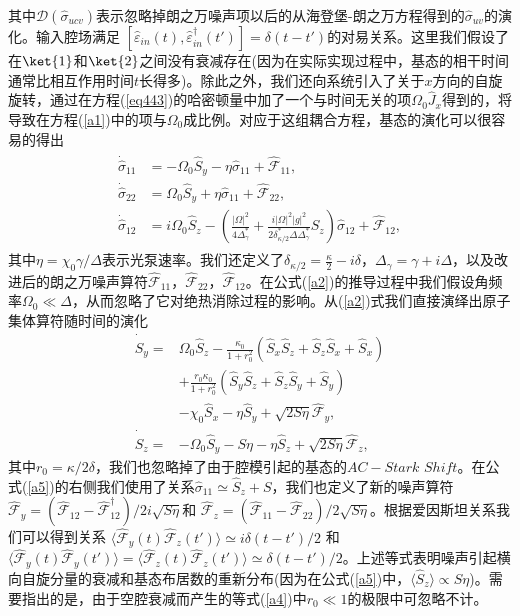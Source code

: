 其中$\mathcal {D}(\hat\sigma_{ucv})$表示忽略掉朗之万噪声项以后的从海登堡-朗之万方程得到的${\hat\sigma}_{uv}$的演化。输入腔场满足 $[\hat\varepsilon_{in}(t),\hat\varepsilon_{in}^\dag(t')]=\delta(t-t')$的对易关系。这里我们假设了在$\ket{1}$和$\ket{2}$之间没有衰减存在(因为在实际实现过程中，基态的相干时间通常比相互作用时间$t$长得多)。除此之外，我们还向系统引入了关于$x$方向的自旋旋转，通过在方程(\ref{eq443})的哈密顿量中加了一个与时间无关的项$\Omega_0 \hat J_x$得到的，将导致在方程(\ref{a1})中的项与$\Omega_0 $成比例。对应于这组耦合方程，基态的演化可以很容易的得出
\begin{align}\label{a2}
\begin{split}
\dot {\hat \sigma}_{11} &= -\Omega_0 {\hat S}_y - \eta{\hat\sigma}_{11} +\hat{\mathcal{F}}_{11}, \\
\dot {\hat \sigma}_{22} &= \Omega_0 {\hat S}_y +\eta{\hat\sigma}_{11}+\hat{\mathcal{F}}_{22},\\
\dot {\hat \sigma}_{12} &= i\Omega_0 {\hat S}_z - \left(\frac{|\Omega|^2}{4\Delta_\gamma^\ast}+  \frac{i|\Omega|^2|g|^2}{2\delta_{\kappa/2}^\ast\Delta\Delta_\gamma^\ast}S_z\right){\hat\sigma}_{12}+\hat{\mathcal{F}}_{12}, 
\end{split}
\end{align}
其中$\eta=\chi_0\gamma/\Delta$表示光泵速率。我们还定义了$\delta_{\kappa/2}=\frac\kappa2-i\delta$，$\Delta_\gamma=\gamma+i\Delta$，以及改进后的朗之万噪声算符$\hat{\mathcal{F}}_{11}$，$\hat{\mathcal{F}}_{22}$，$\hat{\mathcal{F}}_{12}$。在公式(\ref{a2})的推导过程中我们假设角频率$\Omega_0\ll \Delta$，从而忽略了它对绝热消除过程的影响。从(\ref{a2})式我们直接演绎出原子集体算符随时间的演化
\begin{align}
{{\dot {\hat S}}_y} =&   {\Omega _0}{{\hat S}_z} - \frac{\kappa_0}{1+r_0^2}\left( {{{\hat S}_x}{{\hat S}_z} + {{\hat S}_z}{{\hat S}_x} + {{\hat S}_x}} \right)\nonumber\\
&+ \frac{r_0\kappa_0}{1+r_0^2}\left( {{{\hat S}_y}{{\hat S}_z} + {{\hat S}_z}{{\hat S}_y} + {{\hat S}_y}} \right)\label{a4}\\
&- {\chi _0}{{\hat S}_x} - \eta {{\hat S}_y} + \sqrt {2S\eta } {\hat {\mathcal{F}}_y},\nonumber\\
\dot {\hat S}_z=&  -\Omega_0 {\hat S}_y - S\eta- \eta{\hat S}_z  +\sqrt{2S\eta}\hat{\mathcal{F}}_z,\label{a5}
\end{align}
其中$r_0=\kappa/2\delta$，我们也忽略掉了由于腔模引起的基态的$AC-Stark$ $Shift$。在公式(\ref{a5})的右侧我们使用了关系$\hat\sigma_{11}\simeq\hat S_z+S$，我们也定义了新的噪声算符$\hat{\mathcal{F}}_y= (\hat{\mathcal{F}}_{12}-\hat{\mathcal{F}}_{12}^\dag)/2i\sqrt{S\eta}$和 $\hat{\mathcal{F}}_z= (\hat{\mathcal{F}}_{11}-\hat{\mathcal{F}}_{22})/2\sqrt{S\eta}$。根据爱因斯坦关系我们可以得到关系 $\langle\hat{\mathcal{F}}_y(t) \hat{\mathcal{F}}_z(t')\rangle\simeq i\delta(t-t')/2$ 和 $\langle\hat{\mathcal{F}}_y(t)\hat{\mathcal{F}}_y(t')\rangle=\langle\hat{\mathcal{F}}_z(t)\hat{\mathcal{F}}_z(t')\rangle\simeq \delta(t-t')/2$。上述等式表明噪声引起横向自旋分量的衰减和基态布居数的重新分布(因为在公式(\ref{a5})中，$\langle \hat S_z\rangle\propto S\eta$)。需要指出的是，由于空腔衰减而产生的等式(\ref{a4})中$r_0\ll 1$的极限中可忽略不计。

